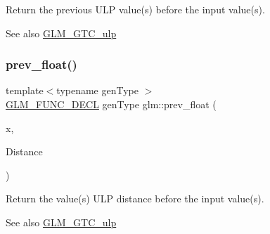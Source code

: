 Return the previous U\+LP value(s) before the input value(s). \begin{DoxySeeAlso}{See also}
\mbox{\hyperlink{group__gtc__ulp}{G\+L\+M\+\_\+\+G\+T\+C\+\_\+ulp}} 
\end{DoxySeeAlso}
\mbox{\label{group__gtc__ulp_gaa399d5b6472a70e8952f9b26ecaacdec}} 
\subsubsection{\texorpdfstring{prev\_float()}{prev\_float()}\hspace{0.1cm}{\footnotesize\ttfamily [2/2]}}
{\footnotesize\ttfamily template$<$typename gen\+Type $>$ \\
\mbox{\hyperlink{setup_8hpp_ab2d052de21a70539923e9bcbf6e83a51}{G\+L\+M\+\_\+\+F\+U\+N\+C\+\_\+\+D\+E\+CL}} gen\+Type glm\+::prev\+\_\+float (\begin{DoxyParamCaption}\item[{gen\+Type const \&}]{x,  }\item[{\mbox{\hyperlink{group__core__precision_ga4fd29415871152bfb5abd588334147c8}{uint}} const \&}]{Distance }\end{DoxyParamCaption})}

Return the value(s) U\+LP distance before the input value(s). \begin{DoxySeeAlso}{See also}
\mbox{\hyperlink{group__gtc__ulp}{G\+L\+M\+\_\+\+G\+T\+C\+\_\+ulp}} 
\end{DoxySeeAlso}
